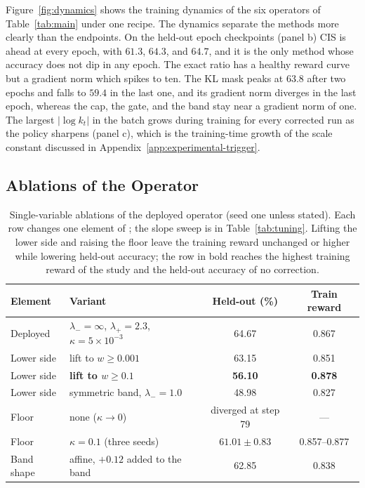Figure~\ref{fig:dynamics} shows the training dynamics of the six operators of Table~\ref{tab:main} under one recipe. The dynamics separate the methods more clearly than the endpoints. On the held-out epoch checkpoints (panel b) CIS is ahead at every epoch, with $61.3$, $64.3$, and $64.7$, and it is the only method whose accuracy does not dip in any epoch. The exact ratio has a healthy reward curve but a gradient norm which spikes to ten. The KL mask peaks at $63.8$ after two epochs and falls to $59.4$ in the last one, and its gradient norm diverges in the last epoch, whereas the cap, the gate, and the band stay near a gradient norm of one. The largest $|\log k_t|$ in the batch grows during training for every corrected run as the policy sharpens (panel c), which is the training-time growth of the scale constant discussed in Appendix~\ref{app:experimental-trigger}.

\subsection{Ablations of the Operator}
\label{app:experimental-ablation}

\begin{table}[h]
\centering
\caption{Single-variable ablations of the deployed operator (seed one unless stated). Each row changes one element of ; the slope sweep is in Table~\ref{tab:tuning}. Lifting the lower side and raising the floor leave the training reward unchanged or higher while lowering held-out accuracy; the row in bold reaches the highest training reward of the study and the held-out accuracy of no correction.}
\label{tab:ablation}
\small
\begin{tabular}{llcc}
\toprule
Element & Variant & Held-out (\%) & Train reward \\
\midrule
Deployed & $\lambda_-=\infty$, $\lambda_+=2.3$, $\kappa=5\times10^{-3}$ & 64.67 & 0.867 \\
Lower side & lift to $w\ge0.001$ & 63.15 & 0.851 \\
Lower side & \textbf{lift to $w\ge0.1$} & \textbf{56.10} & \textbf{0.878} \\
Lower side & symmetric band, $\lambda_-=1.0$ & 48.98 & 0.827 \\
Floor & none ($\kappa\to0$) & diverged at step 79 & --- \\
Floor & $\kappa=0.1$ (three seeds) & $61.01\pm0.83$ & 0.857--0.877 \\
Band shape & affine, $+0.12$ added to the band & 62.85 & 0.838 \\
\bottomrule
\end{tabular}
\end{table}

